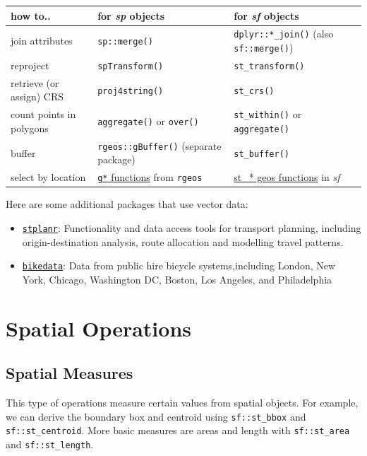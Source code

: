 \documentclass[
  11pt,
]{book}
\providecommand{\tightlist}{%
  \setlength{\itemsep}{0pt}\setlength{\parskip}{0pt}}
\begin{document}
\begin{longtable}[]{@{}lll@{}}
\toprule
how to.. & for \emph{sp} objects & for \emph{sf} objects \\
\midrule
\endhead
join attributes & \texttt{sp::merge()} & \texttt{dplyr::*\_join()} (also \texttt{sf::merge()}) \\
reproject & \texttt{spTransform()} & \texttt{st\_transform()} \\
retrieve (or assign) CRS & \texttt{proj4string()} & \texttt{st\_crs()} \\
count points in polygons & \texttt{aggregate()} or \texttt{over()} & \texttt{st\_within()} or \texttt{aggregate()} \\
buffer & \texttt{rgeos::gBuffer()} (separate package) & \texttt{st\_buffer()} \\
select by location & \href{https://www.rdocumentation.org/packages/rgeos/}{\texttt{g*} functions} from \texttt{rgeos} & \href{https://www.rdocumentation.org/packages/sf/topics/geos}{st\_* geos functions} in \emph{sf} \\
\bottomrule
\end{longtable}

Here are some additional packages that use vector data:

\begin{itemize}
\tightlist
\item
  \href{https://CRAN.R-project.org/package=stplanr}{\texttt{stplanr}}: Functionality and data access tools for transport planning, including origin-destination analysis, route allocation and modelling travel patterns.
\item
  \href{https://CRAN.R-project.org/package=bikedata}{\texttt{bikedata}}: Data from public hire bicycle systems,including London, New York, Chicago, Washington DC, Boston, Los Angeles, and Philadelphia
\end{itemize}

\hypertarget{spatial-operations}{%
\section{Spatial Operations}\label{spatial-operations}}

\hypertarget{spatial-measures}{%
\subsection{Spatial Measures}\label{spatial-measures}}

This type of operations measure certain values from spatial objects. For example, we can derive the boundary box and centroid using \texttt{sf::st\_bbox} and \texttt{sf::st\_centroid}. More basic measures are areas and length with \texttt{sf::st\_area} and \texttt{sf::st\_length}.
\end{document}
